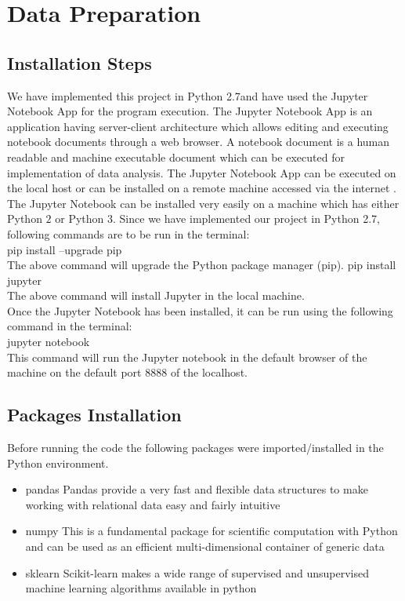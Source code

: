 \section{Data Preparation}

\subsection*{Installation Steps}
We have implemented this project in Python 2.7and have used the Jupyter Notebook App for the program execution. The Jupyter Notebook App is an application having server-client architecture which allows editing and executing notebook documents through a web browser. A notebook document is a human readable and machine executable document which can be executed for implementation of data analysis. The Jupyter Notebook App can be executed on the local host or can be installed on a remote machine accessed via the internet \cite{link15}. \\
The Jupyter Notebook can be installed very easily on a machine which has either Python $2$ or Python $3$. Since we have implemented our project in Python 2.7, following commands are to be run in the terminal:\\
pip install --upgrade pip \\
The above command will upgrade the Python package manager (pip).
pip install jupyter \\
The above command will install Jupyter in the local machine.\\
Once the Jupyter Notebook has been installed, it can be run using the following command in the terminal:\\
jupyter notebook\\
This command will run the Jupyter notebook in the default browser of the machine on the default port $8888$ of the localhost.

\subsection{Packages Installation}
Before running the code the following packages were imported/installed in the Python environment.

\begin{itemize}
    \item pandas
    Pandas provide a very fast and flexible data structures to make working with relational data easy and fairly intuitive
    \item numpy
    This is a fundamental package for scientific computation with Python and can be used as an efficient multi-dimensional container of generic data
    \item sklearn
    Scikit-learn makes a wide range of supervised and unsupervised machine learning algorithms  available in python
\end{itemize}


